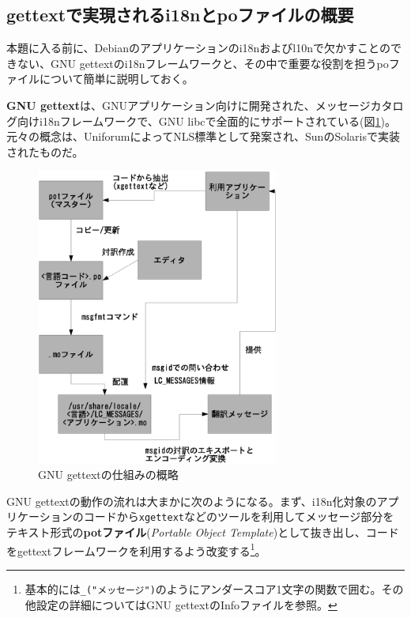 \documentclass[mingoth,a4paper]{jsarticle}
\begin{document}
\subsection{gettextで実現されるi18nとpoファイルの概要}
\label{sec:extremadura-po}

本題に入る前に、Debianのアプリケーションのi18nおよびl10nで欠かすことのできない、GNU gettextのi18nフレームワークと、その中で重要な役割を担うpoファイルについて簡単に説明しておく。

\textbf{GNU gettext}は、GNUアプリケーション向けに開発された、メッセージカタログ向けi18nフレームワークで、GNU libcで全面的にサポートされている(図\ref{fig:extremadura-gettext})。元々の概念は、UniforumによってNLS標準として発案され、SunのSolarisで実装されたものだ。


\begin{figure}[h]
  \begin{center}
    \includegraphics[width=8cm]{image200610/gettext.eps}
  \end{center}
  \caption{GNU gettextの仕組みの概略}
  \label{fig:extremadura-gettext}
\end{figure}

GNU gettextの動作の流れは大まかに次のようになる。まず、i18n化対象のアプリケーションのコードから\texttt{xgettext}などのツールを利用してメッセージ部分をテキスト形式の\textbf{potファイル}(\emph{Portable Object Template})として抜き出し、コードをgettextフレームワークを利用するよう改変する\footnote{基本的には\texttt{\_("メッセージ")}のようにアンダースコア1文字の関数で囲む。その他設定の詳細についてはGNU gettextのInfoファイルを参照。}。
\end{document}

